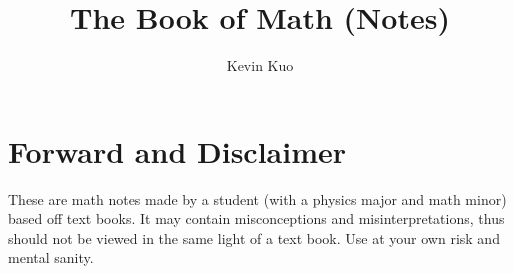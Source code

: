 \documentclass[12pt, english]{book}
\theoremstyle{break}
\theoremstyle{plain}
\begin{document}
	\title{The Book of Math (Notes)}
	\author{Kevin Kuo}
	
	\pagestyle{fancy}
	\fancyhead{} %
	\fancyhead[LO]{  }
	\fancyhead[CO]{  }
	\fancyhead[RO]{  }
	\renewcommand{\headrulewidth}{0pt}
	
	\fancyfoot{} %
	\fancyfoot[LO]{}
	\fancyfoot[CO]{\thepage}
	\fancyfoot[RO]{}
	\renewcommand{\footrulewidth}{0pt}
	\vspace{0cm}	
	
	\frontmatter
	
	\maketitle
	
	\newpage
	\section*{Forward and Disclaimer}
	These are math notes made by a student (with a physics major and math minor) based off text books. It may contain misconceptions and misinterpretations, thus should not be viewed in the same light of a text book. Use at your own risk and mental sanity.
	
\end{document}
